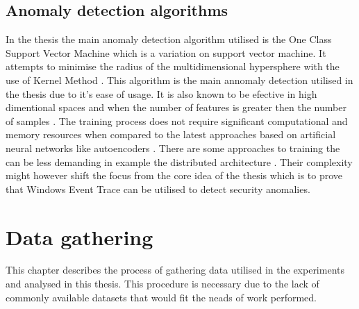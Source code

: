 \documentclass[a4paper,twoside,12pt]{book}
\begin{document}

\section{Anomaly detection algorithms}
In the thesis the main anomaly detection algorithm utilised is the One Class Support 
Vector Machine which is a variation on support vector machine. It attempts to minimise 
the radius of the multidimensional hypersphere with the use of Kernel Method \cite{bib:ocsvm}. 
This algorithm is the main annomaly detection utilised in the thesis due to it's ease of
usage. It is also known to be efective in high dimentional spaces and when 
the number of features is greater then the number of samples \cite{bib:svms}. The training process 
does not require significant computational and memory resources when compared to the latest
approaches based on artificial neural networks like autoencoders \cite{bib:autoencoder}. There are
some approaches to training the can be less demanding in example the distributed architecture
\cite{bib:autoencoderDist}. Their complexity might however shift the focus from the core idea 
of the thesis which is to prove that Windows Event Trace can be utilised to detect security
anomalies.



\chapter{Data gathering}

This chapter describes the process of gathering data utilised in the experiments and 
analysed in this thesis. This procedure is necessary due to the lack of commonly available 
datasets that would fit the neads of work performed. 
\end{document}
